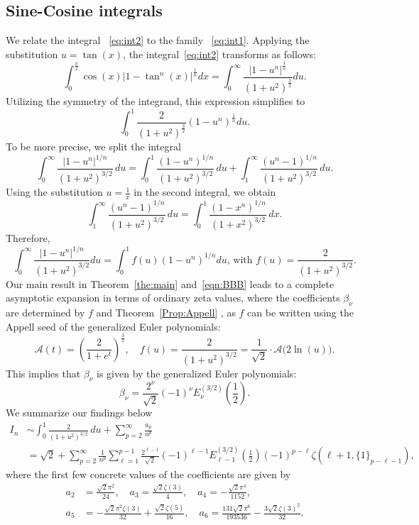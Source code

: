 \documentclass[10pt,reqno,a4paper]{amsart}%
\theoremstyle{definition}
\newcommand{\ap}{\ensuremath{\mathcal{A}}}%
\begin{document}
\subsection{Sine-Cosine integrals}
We relate the integral ~\eqref{eq:int2} to the family ~\eqref{eq:int1}.
Applying the substitution $u=\tan(x)$, the integral~\eqref{eq:int2} transforms
as follows:
\[
\int_{0}^{\frac{\pi}{2}}\cos(x)\bigl|1-\tan^{n}(x)\bigr|^{\frac{1}{n}}%
dx=\int_{0}^{\infty}\frac{\lvert1-u^{n}\rvert^{\frac{1}{n}}}{(1+u^{2}%
)^{\frac{3}{2}}}du.
\]
Utilizing the symmetry of the integrand, this expression simplifies to
\begin{equation}
\int_{0}^{1}\frac{2}{(1+u^{2})^{\frac{3}{2}}}(1-u^{n})^{\frac{1}{n}}du.
\end{equation}
To be more precise, we split the integral
\[
\int_{0}^{\infty}\frac{|1-u^{n}|^{1/n}}{(1+u^{2})^{3/2}}\,du=\int_{0}^{1}%
\frac{(1-u^{n})^{1/n}}{(1+u^{2})^{3/2}}\,du+\int_{1}^{\infty}\frac
{(u^{n}-1)^{1/n}}{(1+u^{2})^{3/2}}\,du.
\]
Using the substitution $u=\tfrac{1}{x}$ in the second integral, we obtain
\[
\int_{1}^{\infty}\frac{(u^{n}-1)^{1/n}}{(1+u^{2})^{3/2}}\,du=\int_{0}^{1}%
\frac{(1-x^{n})^{1/n}}{(1+x^{2})^{3/2}}\,dx.
\]
Therefore,
\[
\int_{0}^{\infty}\frac{|1-u^{n}|^{1/n}}{(1+u^{2})^{3/2}}du=\int_{0}%
^{1}f(u)(1-u^{n})^{1/n}du,\,\text{with }f(u)=\frac{2}{(1+u^{2})^{3/2}}.
\]
Our main result in Theorem~\ref{the:main} and~\eqref{eqn:BBB} leads to a
complete asymptotic expansion in terms of ordinary zeta values, where the
coefficients $\beta_{\nu}$ are determined by $f$ and Theorem~\ref{Prop:Appell}%
, as $f$ can be written using the Appell seed of the generalized Euler
polynomials:
\[
\ap(t)=\left(  \frac{2}{1+e^{t}}\right)  ^{\frac{3}{2}},\quad
f(u)=\frac{2}{(1+u^{2})^{3/2}}=\frac{1}{\sqrt{2}}\cdot\ap%
\big(2\ln(u)\big).
\]
This implies that $\beta_{\nu}$ is given by the generalized Euler
polynomials:
\[
\beta_{\nu}=\frac{2^{\nu}}{\sqrt{2}}(-1)^{\nu}E_{\nu}^{(3/2)}(\frac{1}{2}).
\]
We summarize our findings below
\[%
\begin{split}
I_{n}  &  \sim\int_{0}^{1}\frac{2}{(1+u^{2})^{3/2}}\,du+\sum_{p=2}^{\infty
}\frac{a_{p}}{n^{p}}\\
&  =\sqrt{2}+\sum_{p=2}^{\infty}\frac{1}{n^{p}}\sum_{\ell=1}^{p-1}%
\frac{2^{\ell-1}}{\sqrt{2}}(-1)^{\ell-1}E_{\ell-1}^{(3/2)}(\frac{1}%
{2})(-1)^{p-\ell}\zeta(\ell+1,\{1\}_{p-\ell-1}),
\end{split}
\]
where the first few concrete values of the coefficients are given by
\begin{align*}
a_{2}&=\frac{\sqrt{2}\pi^{2}}{24},\quad
a_{3}=\frac{\sqrt{2}\zeta(3)}{4},\quad a_{4}=-\frac{\sqrt{2}\pi^{4}}{1152},\\
a_{5}  &  =-\frac{\sqrt{2}\pi^{2}\zeta(3)}{32}+\frac{\sqrt{2}\zeta(5)}%
{16},\quad a_{6}=\frac{131\sqrt{2}\pi^{6}}{193536}-\frac{3\sqrt{2}\zeta
(3)^{2}}{32}.
\end{align*}
\end{document}
